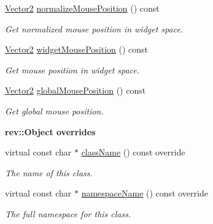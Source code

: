 \begin{Indent}
\begin{DoxyCompactItemize}
\mbox{\hyperlink{classrev_1_1_vector}{Vector2}} \mbox{\hyperlink{classrev_1_1_mouse_handler_ad3113a63ac820d363b5e3be6e5e0ef3c}{normalize\+Mouse\+Position}} () const
\begin{DoxyCompactList}\small\item\em Get normalized mouse position in widget space. \end{DoxyCompactList}\item 
\mbox{\label{classrev_1_1_mouse_handler_a372dfc626e91d903e401d7406c0d0b62}} 
\mbox{\hyperlink{classrev_1_1_vector}{Vector2}} \mbox{\hyperlink{classrev_1_1_mouse_handler_a372dfc626e91d903e401d7406c0d0b62}{widget\+Mouse\+Position}} () const
\begin{DoxyCompactList}\small\item\em Get mouse position in widget space. \end{DoxyCompactList}\item 
\mbox{\label{classrev_1_1_mouse_handler_acefd9cc54b0bae8f1099db82c688144a}} 
\mbox{\hyperlink{classrev_1_1_vector}{Vector2}} \mbox{\hyperlink{classrev_1_1_mouse_handler_acefd9cc54b0bae8f1099db82c688144a}{global\+Mouse\+Position}} () const
\begin{DoxyCompactList}\small\item\em Get global mouse position. \end{DoxyCompactList}\end{DoxyCompactItemize}
\end{Indent}
\begin{Indent}\textbf{ rev\+::Object overrides}\par
\begin{DoxyCompactItemize}
\item 
virtual const char $\ast$ \mbox{\hyperlink{classrev_1_1_mouse_handler_ace8eaee7d8e16bfe3636c7d85615c075}{class\+Name}} () const override
\begin{DoxyCompactList}\small\item\em The name of this class. \end{DoxyCompactList}\item 
virtual const char $\ast$ \mbox{\hyperlink{classrev_1_1_mouse_handler_ad140db2a92a48fa1b1f70f0823a5ea16}{namespace\+Name}} () const override
\begin{DoxyCompactList}\small\item\em The full namespace for this class. \end{DoxyCompactList}\end{DoxyCompactItemize}
\end{Indent}
